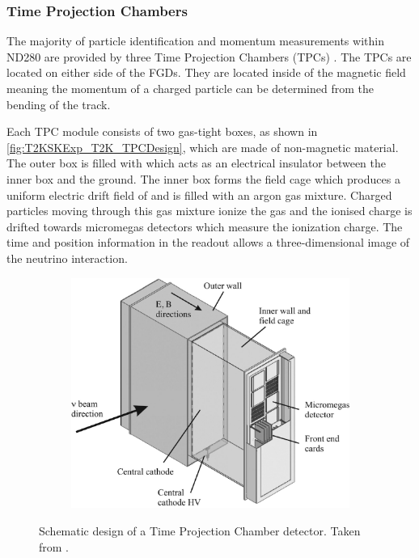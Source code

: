 \subsubsection{Time Projection Chambers}
\label{subsubsec:T2KSKExp_T2K_TPCs}

The majority of particle identification and momentum measurements within ND280 are provided by three Time Projection Chambers (TPCs) \cite{Abgrall2011}. The TPCs are located on either side of the FGDs. They are located inside of the magnetic field meaning the momentum of a charged particle can be determined from the bending of the track.

Each TPC module consists of two gas-tight boxes, as shown in \autoref{fig:T2KSKExp_T2K_TPCDesign}, which are made of non-magnetic material. The outer box is filled with  which acts as an electrical insulator between the inner box and the ground. The inner box forms the field cage which produces a uniform electric drift field of  and is filled with an argon gas mixture. Charged particles moving through this gas mixture ionize the gas and the ionised charge is drifted towards micromegas detectors which measure the ionization charge. The time and position information in the readout allows a three-dimensional image of the neutrino interaction.

\begin{figure}[h]
  \begin{subfigure}[t]{0.55\textwidth}
    \includegraphics[width=\textwidth, trim={0mm 0mm 0mm 0mm}, clip,page=1]{Figures/Detectors/T2KTPCDesign.pdf}
  \end{subfigure}
  \caption{Schematic design of a Time Projection Chamber detector. Taken from \cite{Abgrall2011}.}
  \label{fig:T2KSKExp_T2K_TPCDesign}
\end{figure}

